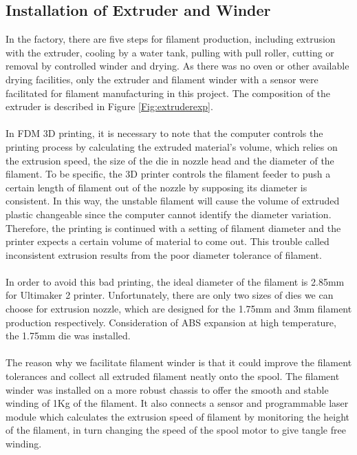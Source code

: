 \subsection{Installation of Extruder and Winder}
In the factory, there are five steps for filament production, including extrusion with the extruder, cooling by a water tank, pulling with pull roller, cutting or removal by controlled winder and drying. As there was no oven or other available drying facilities, only the extruder and filament winder with a sensor were facilitated for filament manufacturing in this project. The composition of the extruder is described in Figure \ref{Fig:extruderexp}.\\
\\
In FDM 3D printing, it is necessary to note that the computer controls the printing process by calculating the extruded material's volume, which relies on the extrusion speed, the size of the die in nozzle head and the diameter of the filament. To be specific, the 3D printer controls the filament feeder to push a certain length of filament out of the nozzle by supposing its diameter is consistent. In this way, the unstable filament will cause the volume of extruded plastic changeable since the computer cannot identify the diameter variation. Therefore, the printing is continued with a setting of filament diameter and the printer expects a certain volume of material to come out. This trouble called inconsistent extrusion results from the poor diameter tolerance of filament.\\
\\
In order to avoid this bad printing, the ideal diameter of the filament is 2.85mm for Ultimaker 2 printer. Unfortunately, there are only two sizes of dies we can choose for extrusion nozzle, which are designed for the 1.75mm and 3mm filament production respectively. Consideration of ABS expansion at high temperature, the 1.75mm die was installed.  \\
\\
The reason why we facilitate filament winder is that it could improve the filament tolerances and collect all extruded filament neatly onto the spool. The filament winder was installed on a more robust chassis to offer the smooth and stable winding of 1Kg of the filament. It also connects a sensor and programmable laser module which calculates the extrusion speed of filament by monitoring the height of the filament, in turn changing the speed of the spool motor to give tangle free winding.\\
\\
